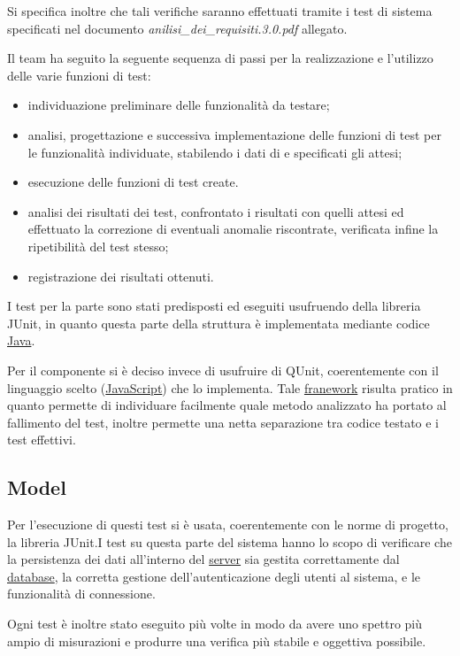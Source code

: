 Si specifica inoltre che tali verifiche saranno effettuati tramite i test di sistema specificati nel documento \textit{anilisi\_dei\_requisiti.3.0.pdf} allegato.
\clearpage

Il team ha seguito la seguente sequenza di passi per la realizzazione e l'utilizzo delle varie funzioni di test:
\begin{itemize}[noitemsep,nolistsep]
\item individuazione preliminare delle funzionalità da testare;
\item analisi, progettazione e successiva implementazione delle funzioni di test per le funzionalità individuate, stabilendo i dati di  e specificati gli  attesi;
\item esecuzione delle funzioni di test create.
\item analisi dei risultati dei test, confrontato i risultati con quelli attesi ed effettuato la correzione di eventuali anomalie riscontrate, verificata infine la ripetibilità del test stesso;
\item registrazione dei risultati ottenuti.
\end{itemize}

I test per la parte  sono stati predisposti ed eseguiti usufruendo della libreria JUnit, in quanto questa parte della struttura è implementata mediante codice \underline{Java}.

Per il componente  si è deciso invece di usufruire di QUnit, coerentemente con il linguaggio scelto (\underline{JavaScript}) che lo implementa. Tale \underline{franework} risulta pratico in quanto permette di individuare facilmente quale metodo analizzato ha portato al fallimento del test, inoltre permette una netta separazione tra codice testato e i test effettivi.

\subsection{Model}
Per l'esecuzione di questi test si è usata, coerentemente con le norme di progetto, la libreria JUnit.I test su questa parte del sistema hanno lo scopo di verificare che la persistenza dei dati all'interno del \underline{server} sia gestita correttamente dal \underline{database}, la corretta gestione dell'autenticazione degli utenti al sistema, e le funzionalità di connessione.

Ogni test è inoltre stato eseguito più volte in modo da avere uno spettro più ampio di misurazioni e produrre una verifica più stabile e oggettiva possibile.


